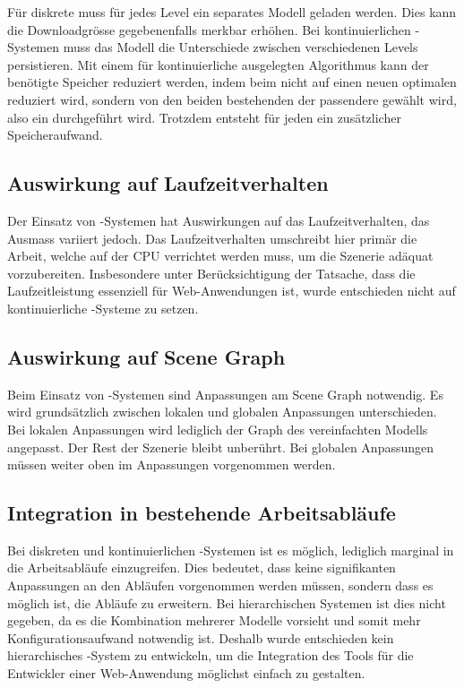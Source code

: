 Für diskrete  muss für jedes Level ein separates Modell geladen werden. Dies kann die Downloadgrösse gegebenenfalls merkbar erhöhen. Bei kontinuierlichen -Systemen muss das Modell die Unterschiede zwischen verschiedenen Levels persistieren. Mit einem für kontinuierliche  ausgelegten Algorithmus kann der benötigte Speicher reduziert werden, indem beim  nicht auf einen neuen optimalen  reduziert wird, sondern von den beiden bestehenden  der passendere gewählt wird, also ein  durchgeführt wird. Trotzdem entsteht für jeden  ein zusätzlicher Speicheraufwand.

\subsection{Auswirkung auf Laufzeitverhalten}

Der Einsatz von -Systemen hat Auswirkungen auf das Laufzeitverhalten, das Ausmass variiert jedoch. Das Laufzeitverhalten umschreibt hier primär die Arbeit, welche auf der \gls{CPU} verrichtet werden muss, um die Szenerie adäquat vorzubereiten.
Insbesondere unter Berücksichtigung der Tatsache, dass die Laufzeitleistung essenziell für Web-Anwendungen ist, wurde entschieden nicht auf kontinuierliche -Systeme zu setzen.

\subsection{Auswirkung auf Scene Graph}
Beim Einsatz von -Systemen sind Anpassungen am \gls{Scene Graph} notwendig. Es wird grundsätzlich zwischen lokalen und globalen Anpassungen unterschieden. Bei lokalen Anpassungen wird lediglich der Graph des vereinfachten Modells angepasst. Der Rest der Szenerie bleibt unberührt. Bei globalen Anpassungen müssen weiter oben im  Anpassungen vorgenommen werden.

\subsection{Integration in bestehende Arbeitsabläufe}

Bei diskreten und kontinuierlichen -Systemen ist es möglich, lediglich marginal in die Arbeitsabläufe einzugreifen. Dies bedeutet, dass keine signifikanten Anpassungen an den Abläufen vorgenommen werden müssen, sondern dass es möglich ist, die Abläufe zu erweitern.
Bei hierarchischen Systemen ist dies nicht gegeben, da es die Kombination mehrerer Modelle vorsieht und somit mehr Konfigurationsaufwand notwendig ist.
Deshalb wurde entschieden kein hierarchisches -System zu entwickeln, um die Integration des Tools für die Entwickler einer Web-Anwendung möglichst einfach zu gestalten.

